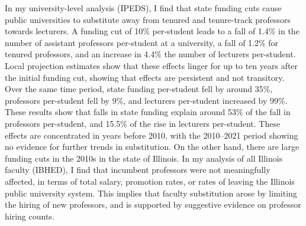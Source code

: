 In my university-level analysis (IPEDS), I find that state funding cuts cause public universities to substitute away from tenured and tenure-track professors towards lecturers.
A funding cut of 10\% per-student leads to a fall of 1.4\% in the number of assistant professors per-student at a university, a fall of 1.2\% for tenured professors, and an increase in 4.4\% the number of lecturers per-student.
Local projection estimates show that these effects linger for up to ten years after the initial funding cut, showing that effects are persistent and not transitory.
Over the same time period, state funding per-student fell by around 35\%, professors per-student fell by 9\%, and lecturers per-student increased by 99\%.
These results show that falls in state funding explain around 53\% of the fall in professors per-student,
and 15.5\% of the rise in lecturers per-student.
These effects are concentrated in years before 2010, with the 2010--2021 period showing no evidence for further trends in substitution.  
On the other hand, there are large funding cuts in the 2010s in the state of Illinois.
In my analysis of all Illinois faculty (IBHED), I find that incumbent professors were not meaningfully affected, in terms of total salary, promotion rates, or rates of leaving the Illinois public university system.
This implies that faculty substitution arose by limiting the hiring of new professors, and is supported by suggestive evidence on professor hiring counts.

